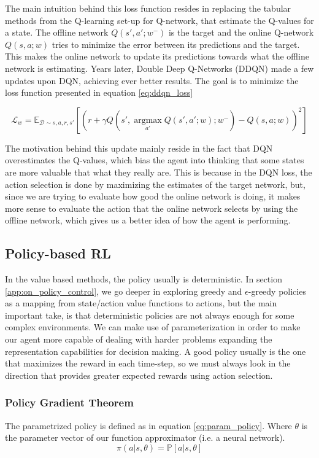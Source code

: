 The main intuition behind this loss function resides in replacing the tabular methods from the Q-learning set-up for Q-network, that estimate the Q-values for a state. The offline network $Q(s', a'; w^-)$ is the target and the online Q-network $Q(s, a; w)$ tries to minimize the error between its predictions and the target. This makes the online network to update its predictions towards what the offline network is estimating. Years later, Double Deep Q-Networks (DDQN) \cite{vanhasselt2015deep} made a few updates upon DQN, achieving ever better results. The goal is to minimize the loss function presented in equation \ref{eq:ddqn_loss} 

\begin{equation} \label{eq:ddqn_loss}
	\mathcal{L}_w =  \mathbb{E}_{\mathcal{D} \sim s, a, r, s'} \left[ \left( r + \gamma Q(s', \operatorname*{argmax}_{a'} Q(s', a'; w); w^-) - Q(s, a; w) \right)^2 \right]
\end{equation}

The motivation behind this update mainly reside in the fact that DQN overestimates the Q-values, which bias the agent into thinking that some states are more valuable that what they really are. This is because in the DQN loss, the action selection is done by maximizing the estimates of the target network, but, since we are trying to evaluate how good the online network is doing, it makes more sense to evaluate the action that the online network selects by using the offline network, which gives us a better idea of how the agent is performing.

\subsection{Policy-based RL}
\label{sec:pol-grad-ac}
In the value based methods, the policy usually is deterministic. In section \ref{app:on_policy_control}, we go deeper in exploring greedy and $\epsilon$-greedy policies as a mapping from state/action value functions to actions, but the main important take, is that deterministic policies are not always enough for some complex environments. We can make use of parameterization in order to make our agent more capable of dealing with harder problems expanding the representation capabilities for decision making. A good policy usually is the one that maximizes the reward in each time-step, so we must always look in the direction that provides greater expected rewards using action selection. 

\subsubsection{Policy Gradient Theorem}
\label{sec:pol-grad-theorem}
The parametrized policy is defined as in equation \ref{eq:param_policy}. Where $\theta$ is the parameter vector of our function approximator (i.e. a neural network).
\begin{equation} \label{eq:param_policy}
	\pi(a|s, \theta) = \mathbb{P}[a|s, \theta]
\end{equation}

